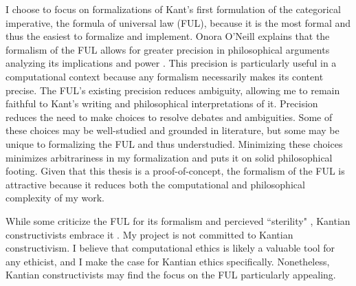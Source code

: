 \begin{isabellebody}
\begin{isamarkuptext}
I choose to focus on formalizations of Kant's first formulation of the categorical imperative,
the formula of universal law (FUL), because it is the most formal and thus the easiest to formalize and implement. 
Onora O'Neill explains that the formalism of the FUL allows 
for greater precision in philosophical arguments analyzing its implications and power \cite[33]{actingonprinciple}. This precision 
is particularly useful in a computational context because any formalism necessarily makes its content 
precise. The FUL's existing precision reduces ambiguity, allowing me to remain faithful to Kant's writing and 
philosophical interpretations of it. Precision reduces the need to make choices to resolve debates 
and ambiguities. Some of these choices may be well-studied and grounded in literature, 
but some may be unique to formalizing the FUL and thus understudied. Minimizing these choices minimizes 
arbitrariness in my formalization and puts it on solid philosophical footing. Given that this thesis is a proof-of-concept, 
the formalism of the FUL is attractive because it reduces both the computational and philosophical complexity of my work. 

While some criticize the FUL for its formalism and percieved ``sterility" \cite[33]{actingonprinciple}, 
Kantian constructivists embrace it \cite[173]{ebelsduggan}. My project is not committed to Kantian constructivism. 
I believe that computational ethics is likely a valuable tool for any ethicist, and I make the case 
for Kantian ethics specifically. Nonetheless, Kantian constructivists may find the focus on 
the FUL particularly appealing. 


\end{isamarkuptext}
\end{isabellebody}
